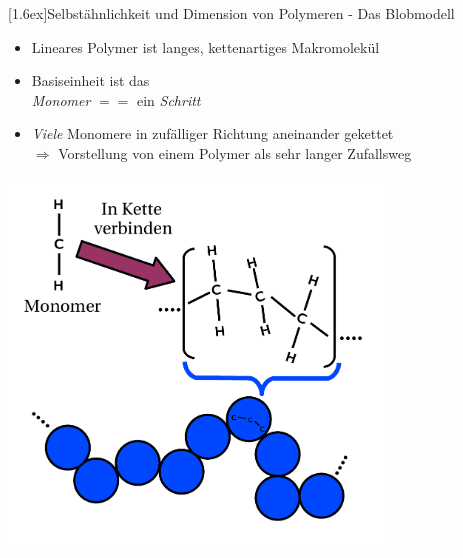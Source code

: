 \documentclass[final]{beamer}
\newlength{\columnheight}
\newlength{\marginw}
\newlength{\tw}
\newlength{\colw}
\newenvironment{myTwoColPoster}{%
  \begin{minipage}[t]{\textwidth}%
    \hspace*{\marginw}%
    \hspace*{9.5bp}%
    \begin{minipage}[t]{\tw}}%
  {\end{minipage}%
   \hspace*{\marginw}%
   \end{minipage}}
\newenvironment{myCol}%
    {\begin{minipage}[t][\columnheight][t]{\colw}}%
    {\end{minipage}}
\newenvironment{textblock}[1]%
    {\begin{block}{\rule[-0.6ex]{0pt}{2.4ex}\raisebox{-0.25ex}[1.6ex]{#1}}%
     \vspace*{5mm}}%
    {\vspace*{5mm}\end{block}}
\begin{document}
\begin{frame}[t]{}
\begin{myTwoColPoster}
\begin{myCol}
  \begin{textblock}{Selbst\"ahnlichkeit und Dimension von Polymeren - Das Blobmodell}

    \begin{minipage}[c]{0.55\textwidth}
      \begin{itemize} \setlength\itemsep{1.1em} \Large
        \item Lineares Polymer ist langes, kettenartiges Makromolek\"ul
        \item Basiseinheit ist das\\
        \textit{ Monomer} $==$ ein \textit{Schritt}
        \item \textit{Viele} Monomere in zuf\"alliger Richtung aneinander gekettet\\[1.2em]
        $\Rightarrow$ \textcolor{IPForange}{Vorstellung von einem Polymer als sehr langer Zufallsweg}
      \end{itemize}
    \end{minipage}\hfill
    \begin{minipage}[c]{0.41\textwidth}
      \includegraphics[width=0.75\textwidth]{fig/monchain}
    \end{minipage}
    \vspace*{1cm}
    \begin{center}
      \begin{minipage}[c]{0.2\textwidth}

\end{minipage}
\end{center}
\end{textblock}
\end{myCol}
\end{myTwoColPoster}
\end{frame}
\end{document}
